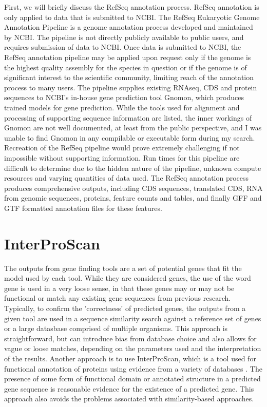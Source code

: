 First, we will briefly discuss the RefSeq annotation process. RefSeq
annotation is only applied to data that is submitted to NCBI. The
RefSeq Eukaryotic Genome Annotation Pipeline\cite{NCBI2024} is a
genome annotation process developed and maintained by NCBI. The
pipeline is not directly publicly available to public users, and
requires submission of data to NCBI. Once data is submitted to NCBI,
the RefSeq annotation pipeline may be applied upon request only if the
genome is the highest quality assembly for the species in question or
if the genome is of significant interest to the scientific community,
limiting reach of the annotation process to many users. The pipeline
supplies existing RNAseq, CDS and protein sequences to NCBI's in-house
gene prediction tool Gnomon, which produces trained models for gene
prediction. While the tools used for alignment and processing of
supporting sequence information are listed, the inner workings of
Gnomon are not well documented, at least from the public perspective,
and I was unable to find Gnomon in any compilable or executable form
during my search. Recreation of the RefSeq pipeline would prove
extremely challenging if not impossible without supporting
information. Run times for this pipeline are difficult to determine
due to the hidden nature of the pipeline, unknown compute resources
and varying quantities of data used. The RefSeq annotation process
produces comprehensive outputs, including CDS sequences, translated
CDS, RNA from genomic sequences, proteins, feature counts and tables,
and finally GFF and GTF formatted annotation files for these features.

\section{InterProScan}
The outputs from gene finding tools are a set of potential genes that
fit the model used by each tool. While they are considered genes, the
use of the word gene is used in a very loose sense, in that these
genes may or may not be functional or match any existing gene
sequences from previous research. Typically, to confirm the
'correctness' of predicted genes, the outputs from a given tool are
used in a sequence similarity search against a reference set of genes
or a large datasbase comprised of multiple organisms. This approach is
straightforward, but can introduce bias from database choice and also
allows for vague or loose matches, depending on the parameters used
and the interpretation of the results. Another approach is to use
InterProScan, which is a tool used for functional annotation of
proteins using evidence from a variety of databases
\cite{10.1093/nar/gkac993}. The presence of some form of functional
domain or annotated structure in a predicted gene sequence is
reasonable evidence for the existence of a predicted gene. This
approach also avoids the problems associated with similarity-based
approaches.


